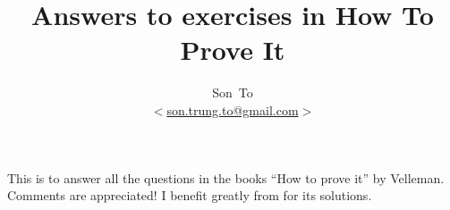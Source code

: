 \documentclass[a4paper,11pt]{article}
\author{Son~To\\
$<$\href{mailto:son.trung.to@gmail.com}{son.trung.to@gmail.com}$>$}
\affil{StaffPoint Oy}
\title{Answers to exercises in How To Prove It}
\theoremstyle{plain} \newtheorem{id}{Lemma}[section]
\theoremstyle{definition} \newtheorem{ex}{Exercise}[subsection]
\theoremstyle{remark}     \newtheorem{ab}{Conjecture}[section]
\begin{document}
  \maketitle
  This is to answer all the questions in the books ``How to prove it'' by Velleman.
  Comments are appreciated! I benefit greatly from \cite{inchmeal} for its solutions.

  \clearpage
  \tableofcontents
  \clearpage

  
  

  
  
\end{document}
